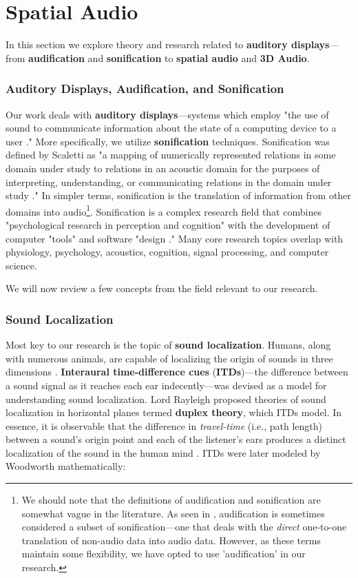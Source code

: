 \documentclass{report}
\newcommand{\tech}[1]{\textbf{#1}}
\begin{document}
\section{Spatial Audio}
In this section we explore theory and research related to \tech{auditory displays}---from \tech{audification} and \tech{sonification} to \tech{spatial audio} and \tech{3D Audio}.

\subsubsection{Auditory Displays, Audification, and Sonification}
Our work deals with \tech{auditory displays}---systems which employ "the use of sound to communicate information about the state of a computing device to a user \cite{audiodisplays}." More specifically, we utilize \tech{sonification} techniques. Sonification was defined by Scaletti as "a mapping of numerically represented relations in some domain under study to relations in an acoustic domain for the purposes of interpreting, understanding, or communicating relations in the domain under study \cite{kramer1994auditory}." In simpler terms, sonification is the translation of information from other domains into audio\footnote{We should note that the definitions of audification and sonification are somewhat vague in the literature. As seen in \cite{vickers2017directsegmentedsonificationcharacteristic}, audification is sometimes considered a subset of sonification---one that deals with the \emph{direct} one-to-one translation of non-audio data into audio data. However, as these terms maintain some flexibility, we have opted to use 'audification' in our research.}. Sonification is a complex research field that combines "psychological research in perception and cognition" with the development of computer "tools" and software "design \cite{kramer2010sonification}." Many core research topics overlap with physiology, psychology, acoustics, cognition, signal processing, and computer science. 

We will now review a few concepts from the field relevant to our research.

\subsubsection{Sound Localization}
Most key to our research is the topic of \tech{sound localization}. Humans, along with numerous animals, are capable of localizing the origin of sounds in three dimensions \cite{middlebrooks2015sound}. \tech{Interaural time-difference cues} (\tech{ITDs})---the difference between a sound signal as it reaches each ear indecently---was devised as a model for understanding sound localization. Lord Rayleigh proposed theories of sound localization in horizontal planes termed \tech{duplex theory}, which ITDs model. In essence, it is observable that the difference in \emph{travel-time} (i.e., path length) between a sound's origin point and each of the listener's ears produces a distinct localization of the sound in the human mind \cite{middlebrooks2015sound}. ITDs were later modeled by Woodworth mathematically:
\end{document}
